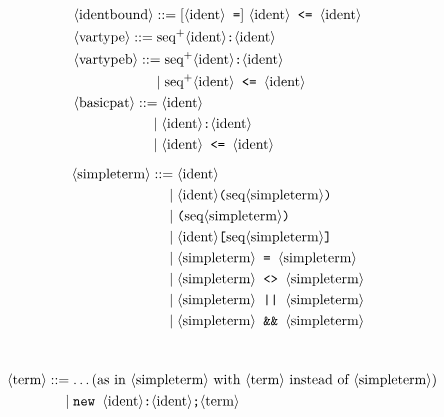 \begin{figure}
\def\phst{\phantom{\nonterm{simpleterm} = }\mid}
\def\pht{\phantom{\nonterm{term} = }\mid}
\def\phpat{\phantom{\nonterm{pattern} = }\mid}
\def\phq{\phantom{\nonterm{query} = }\mid}
\def\phqt{\phantom{\nonterm{queryterm} = }\mid}
\begin{minipage}{8.5cm}
\begin{align*}
&\nonterm{identbound} ::= [\nonterm{ident}\texttt{ =}]\ \nonterm{ident} \texttt{ <= }\nonterm{ident}\\
&\nonterm{vartype} ::= \neseq{ident} \texttt{:}\nonterm{ident}\\
&\nonterm{vartypeb} ::= \neseq{ident} \texttt{:}\nonterm{ident}\\
&\phantom{\nonterm{vartypeb} =}\mid \neseq{ident} \texttt{ <= }\nonterm{ident}\\
&\nonterm{basicpat} ::= \nonterm{ident}\\
&\phantom{\nonterm{basicpat} =}\mid \nonterm{ident}\texttt{:}\nonterm{ident}\\
&\phantom{\nonterm{basicpat} =}\mid \nonterm{ident}\texttt{ <= }\nonterm{ident}\\[-1mm]
\end{align*}
\end{minipage}
\begin{minipage}{7cm}
\begin{align*}
&\nonterm{simpleterm} ::= \nonterm{ident}\\
&\phst \nonterm{ident}\texttt{(}\seq{simpleterm}\texttt{)}\\
&\phst \texttt{(}\seq{simpleterm}\texttt{)}\\
&\phst \nonterm{ident}\texttt{[}\seq{simpleterm}\texttt{]}\\
&\phst \nonterm{simpleterm} \texttt{ = } \nonterm{simpleterm} \\
&\phst \nonterm{simpleterm} \texttt{ <> } \nonterm{simpleterm} \\
&\phst \nonterm{simpleterm} \texttt{ || } \nonterm{simpleterm} \\
&\phst \nonterm{simpleterm} \texttt{ \&\& } \nonterm{simpleterm} 
\end{align*}
\end{minipage}\\
\begin{align*}
&\nonterm{term} ::= \ldots \text{(as in $\nonterm{simpleterm}$ with 
$\nonterm{term}$ instead of $\nonterm{simpleterm}$)}\\
&\pht \Resavt\texttt{;}\nonterm{term}\\

\end{align*}
\end{figure}
